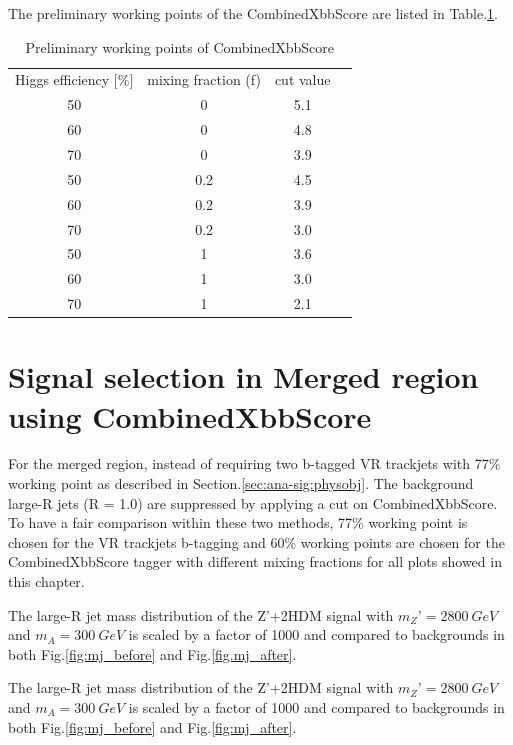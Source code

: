 The preliminary working points of the CombinedXbbScore are listed in Table.\ref{tab:combxbb}.

\begin{table}
    \footnotesize{
        \begin{center}
            \begin{tabular}{ c |c |c |c}
                \hline
                \hline

                Higgs efficiency [\%]	& mixing fraction (f)	& cut value \\
                50	&0	&5.1	 \\
                60	&0	&4.8	 \\
                70	&0	&3.9	 \\
                50	&0.2	&4.5	 \\
                60	&0.2	&3.9	 \\
                70	&0.2	&3.0	 \\
                50	&1	&3.6	 \\
                60	&1	&3.0	 \\
                70	&1	&2.1	\\
                \hline
                \hline
            \end{tabular}
        \end{center}
    }
    \caption{Preliminary working points of CombinedXbbScore}
    \label{tab:combxbb}
\end{table}


\section{Signal selection in Merged region using CombinedXbbScore}
\par For the merged region, instead of requiring two b-tagged VR trackjets  with 77\% working point as described in Section.\ref{sec:ana-sig:physobj}. The background large-R jets (R = 1.0) are suppressed by applying a cut on CombinedXbbScore. To have a fair comparison within these two methods, 77\% working point is chosen for the VR trackjets b-tagging and 60\% working points are chosen for the CombinedXbbScore tagger with different mixing fractions for all plots showed in this chapter.					
\par The large-R jet mass distribution of the Z’+2HDM signal with $m_Z’ = 2800~GeV$ and $m_A = 300~GeV$ is scaled by a factor of 1000 and compared to backgrounds in both Fig.\ref{fig:mj_before} and Fig.\ref{fig.mj_after}. 	
\par The large-R jet mass distribution of the Z’+2HDM signal with $m_Z’ = 2800~GeV$ and $m_A = 300~GeV$ is scaled by a factor of 1000 and compared to backgrounds in both Fig.\ref{fig:mj_before} and Fig.\ref{fig:mj_after}.


